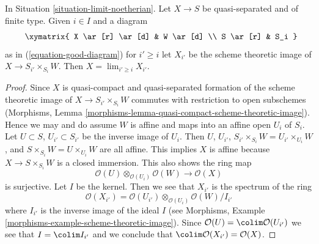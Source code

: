\begin{lemma}
\label{lemma-limit-from-good-diagram}
In Situation \ref{situation-limit-noetherian}.
Let $X \to S$ be quasi-separated and of finite type.
Given $i \in I$ and a diagram
$$
\vcenter{
\xymatrix{
X \ar[r] \ar[d] & W \ar[d] \\
S \ar[r] & S_i
}
}
$$
as in (\ref{equation-good-diagram}) for $i' \geq i$ let
$X_{i'}$ be the scheme theoretic image of $X \to S_{i'} \times_{S_i} W$.
Then $X = \lim_{i' \geq i} X_{i'}$.
\end{lemma}

\begin{proof}
Since $X$ is quasi-compact and quasi-separated formation of the
scheme theoretic image of $X \to S_{i'} \times_{S_i} W$
commutes with restriction to open subschemes
(Morphisms, Lemma \ref{morphisms-lemma-quasi-compact-scheme-theoretic-image}).
Hence we may and do assume $W$ is affine and maps into an affine open
$U_i$ of $S_i$. Let $U \subset S$, $U_{i'} \subset S_{i'}$
be the inverse image of $U_i$. Then $U$, $U_{i'}$, 
$S_{i'} \times_{S_i} W = U_{i'} \times_{U_i} W$, and
$S \times_{S_i} W = U \times_{U_i} W$ are all affine.
This implies $X$ is affine because $X \to S \times_{S_i} W$ is
a closed immersion. This also shows the ring map
$$
\mathcal{O}(U) \otimes_{\mathcal{O}(U_i)} \mathcal{O}(W) \to
\mathcal{O}(X)
$$
is surjective. Let $I$ be the kernel. Then we see that $X_{i'}$
is the spectrum of the ring
$$
\mathcal{O}(X_{i'}) =
\mathcal{O}(U_{i'}) \otimes_{\mathcal{O}(U_i)} \mathcal{O}(W)/I_{i'}
$$
where $I_{i'}$ is the inverse image of the ideal $I$ (see
Morphisms, Example \ref{morphisms-example-scheme-theoretic-image}).
Since $\mathcal{O}(U) = \colim \mathcal{O}(U_{i'})$
we see that $I = \colim I_{i'}$ and we conclude
that $\colim \mathcal{O}(X_{i'}) = \mathcal{O}(X)$.
\end{proof}
